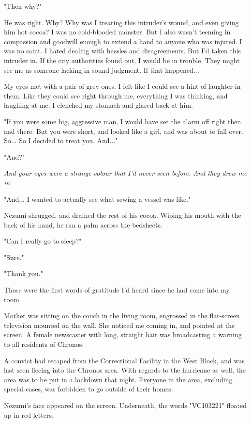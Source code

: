 "Then why?"

He was right. Why? Why was I treating this intruder's wound, and even
giving him hot cocoa? I was no cold-blooded monster. But I also wasn't
teeming in compassion and goodwill enough to extend a hand to anyone who
was injured. I was no saint. I hated dealing with hassles and
disagreements. But I'd taken this intruder in. If the city authorities
found out, I would be in trouble. They might see me as someone lacking
in sound judgment. If that happened...

My eyes met with a pair of grey ones. I felt like I could see a hint of
laughter in them. Like they could see right through me, everything I was
thinking, and laughing at me. I clenched my stomach and glared back at
him.

"If you were some big, aggressive man, I would have set the alarm off
right then and there. But you were short, and looked like a girl, and
was about to fall over. So... So I decided to treat you. And..."

"And?"

\emph{And your eyes were a strange colour that I'd never seen before. And they
	drew me in.}

"And... I wanted to actually see what sewing a vessel was like."

Nezumi shrugged, and drained the rest of his cocoa. Wiping his mouth
with the back of his hand, he ran a palm across the bedsheets.

"Can I really go to sleep?"

"Sure."

"Thank you."

Those were the first words of gratitude I'd heard since he had come into
my room.

\mybreak

Mother was sitting on the couch in the living room, engrossed in the
flat-screen television mounted on the wall. She noticed me coming in,
and pointed at the screen. A female newscaster with long, straight hair
was broadcasting a warning to all residents of Chronos.

A convict had escaped from the Correctional Facility in the West Block,
and was last seen fleeing into the Chronos area. With regards to the
hurricane as well, the area was to be put in a lockdown that night.
Everyone in the area, excluding special cases, was forbidden to go
outside of their homes.

\myspace

Nezumi's face appeared on the screen. Underneath, the words "VC103221"
floated up in red letters.

